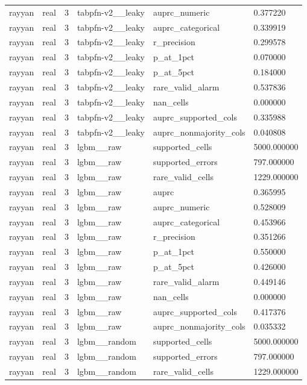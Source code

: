 \begin{tabular}{llllll}
rayyan & real & 3 & tabpfn-v2\_\_leaky & auprc\_numeric & 0.377220 \\
rayyan & real & 3 & tabpfn-v2\_\_leaky & auprc\_categorical & 0.339919 \\
rayyan & real & 3 & tabpfn-v2\_\_leaky & r\_precision & 0.299578 \\
rayyan & real & 3 & tabpfn-v2\_\_leaky & p\_at\_1pct & 0.070000 \\
rayyan & real & 3 & tabpfn-v2\_\_leaky & p\_at\_5pct & 0.184000 \\
rayyan & real & 3 & tabpfn-v2\_\_leaky & rare\_valid\_alarm & 0.537836 \\
rayyan & real & 3 & tabpfn-v2\_\_leaky & nan\_cells & 0.000000 \\
rayyan & real & 3 & tabpfn-v2\_\_leaky & auprc\_supported\_cols & 0.335988 \\
rayyan & real & 3 & tabpfn-v2\_\_leaky & auprc\_nonmajority\_cols & 0.040808 \\
rayyan & real & 3 & lgbm\_\_raw & supported\_cells & 5000.000000 \\
rayyan & real & 3 & lgbm\_\_raw & supported\_errors & 797.000000 \\
rayyan & real & 3 & lgbm\_\_raw & rare\_valid\_cells & 1229.000000 \\
rayyan & real & 3 & lgbm\_\_raw & auprc & 0.365995 \\
rayyan & real & 3 & lgbm\_\_raw & auprc\_numeric & 0.528009 \\
rayyan & real & 3 & lgbm\_\_raw & auprc\_categorical & 0.453966 \\
rayyan & real & 3 & lgbm\_\_raw & r\_precision & 0.351266 \\
rayyan & real & 3 & lgbm\_\_raw & p\_at\_1pct & 0.550000 \\
rayyan & real & 3 & lgbm\_\_raw & p\_at\_5pct & 0.426000 \\
rayyan & real & 3 & lgbm\_\_raw & rare\_valid\_alarm & 0.449146 \\
rayyan & real & 3 & lgbm\_\_raw & nan\_cells & 0.000000 \\
rayyan & real & 3 & lgbm\_\_raw & auprc\_supported\_cols & 0.417376 \\
rayyan & real & 3 & lgbm\_\_raw & auprc\_nonmajority\_cols & 0.035332 \\
rayyan & real & 3 & lgbm\_\_random & supported\_cells & 5000.000000 \\
rayyan & real & 3 & lgbm\_\_random & supported\_errors & 797.000000 \\
rayyan & real & 3 & lgbm\_\_random & rare\_valid\_cells & 1229.000000 \\

\end{tabular}
